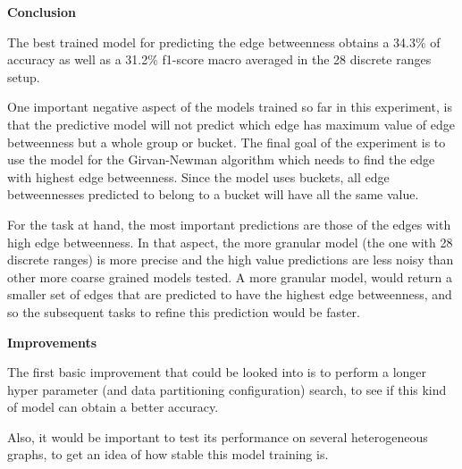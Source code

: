\textbf{Conclusion}

The best trained model for predicting the edge betweenness obtains a 34.3\% of accuracy as well as a 31.2\% f1-score macro averaged in the 28 discrete ranges setup.

One important negative aspect of the models trained so far in this experiment, is that the predictive model will not predict which edge has maximum value of edge betweenness but a whole group or bucket. The final goal of the experiment is to use the model for the Girvan-Newman algorithm which needs to find the edge with highest edge betweenness. Since the model uses buckets, all edge betweennesses predicted to belong to a bucket will have all the same value. 

For the task at hand, the most important predictions are those of the edges with high edge betweenness. In that aspect, the more granular model (the one with 28 discrete ranges) is more precise and the high value predictions are less noisy than other more coarse grained models tested. A more granular model, would return a smaller set of edges that are predicted to have the highest edge betweenness, and so the subsequent tasks to refine this prediction would be faster.


\textbf{Improvements}

The first basic improvement that could be looked into is to perform a longer hyper parameter (and data partitioning configuration) search, to see if this kind of model can obtain a better accuracy. 



Also, it would be important to test its performance on several heterogeneous graphs, to get an idea of how stable this model training is.


